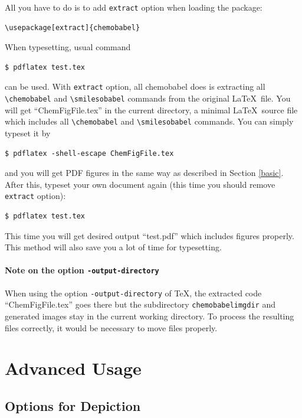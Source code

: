 \documentclass[12pt]{ltjsarticle}
\def\Lpack#1{\textsf{#1}}
\def\Lcode#1{\texttt{#1}}
\begin{document}
All you have to do is to add \verb|extract| option when loading the package:
\begin{verbatim}
\usepackage[extract]{chemobabel}
\end{verbatim}
When typesetting, usual command
\begin{verbatim}
$ pdflatex test.tex
\end{verbatim}
can be used.
With \verb|extract| option, all \Lpack{chemobabel} does is extracting
all \verb|\chemobabel| and \verb|\smilesobabel| commands from the
original \LaTeX\ file.
You will get ``ChemFigFile.tex'' in the current directory, a minimal
\LaTeX\ source file which includes all \verb|\chemobabel| and
\verb|\smilesobabel| commands.
You can simply typeset it by
\begin{verbatim}
$ pdflatex -shell-escape ChemFigFile.tex
\end{verbatim}
and you will get PDF figures in the same way
as described in Section \ref{basic}.
After this, typeset your own document again
(this time you should remove \verb|extract| option):
\begin{verbatim}
$ pdflatex test.tex
\end{verbatim}
This time you will get desired output ``test.pdf''
which includes figures properly.
This method will also save you a lot of time for typesetting.

\paragraph{Note on the option \Lcode{-output-directory}}

When using the option \Lcode{-output-directory} of \TeX,
the extracted code ``ChemFigFile.tex'' goes there
but the subdirectory \verb|chemobabelimgdir| and
generated images stay in the current working directory.
To process the resulting files correctly, it would be
necessary to move files properly.

\clearpage

\section{Advanced Usage}

\subsection{Options for Depiction}
\label{depict}
\end{document}
